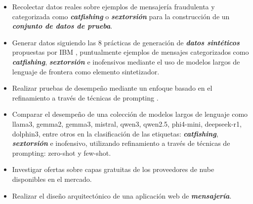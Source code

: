 
\begin{itemize}
    \item Recolectar datos reales sobre ejemplos de mensajería fraudulenta y categorizada como \textbf{\textit{catfishing}} o \textbf{\textit{sextorsión}} para la construcción de un \textbf{\textit{conjunto de datos de prueba}}.

    \item Generar datos siguiendo las 8 prácticas de generación de \textbf{\textit{datos sintéticos}} propuestas por IBM \cite{SynthDataByIbm}, puntualmente ejemplos de mensajes categorizados como \textbf{\textit{catfishing}}, \textbf{\textit{sextorsión}} e inofensivos mediante el uso de modelos largos de lenguaje de frontera como elemento sintetizador.

    \item Realizar pruebas de desempeño mediante un enfoque basado en el refinamiento a través de técnicas de prompting \cite{PromptEngByIBM}.

    \item Comparar el desempeño de una colección de modelos largos de lenguaje como llama3, gemma2, gemma3, mistral, qwen3, qwen2.5, phi4-mini, deepseek-r1, dolphin3, entre otros en la clasificación de las etiquetas: \textbf{\textit{catfishing}}, \textbf{\textit{sextorsión}} e inofensivo, utilizando refinamiento a través de técnicas de prompting: zero-shot y few-shot.
    
    \item Investigar ofertas sobre capas gratuitas de los proveedores de nube disponibles en el mercado.

    \item Realizar el diseño arquitectónico de una aplicación web de \textbf{\textit{mensajería}}.
\end{itemize}


